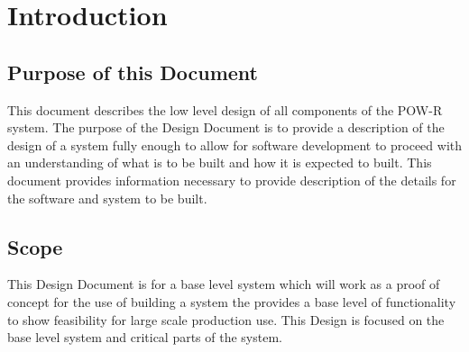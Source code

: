 \chapter{Introduction}

\section{Purpose of this Document}
This document describes the low level design of all components of the \ac{POW-R} system.
The purpose of the  Design Document is to provide a description of the design of a system
fully enough to allow for software development to proceed with an understanding of what is to be
built and how it is expected to built.  This document provides information
necessary to provide description of the details for the software and system to be built.

\section{Scope}
This Design Document is for a base level system which will work as a proof of concept for
the use of building a system the provides a base level of functionality to show feasibility for large
scale production use.  This Design is focused on the base level system and critical parts
of the system.


